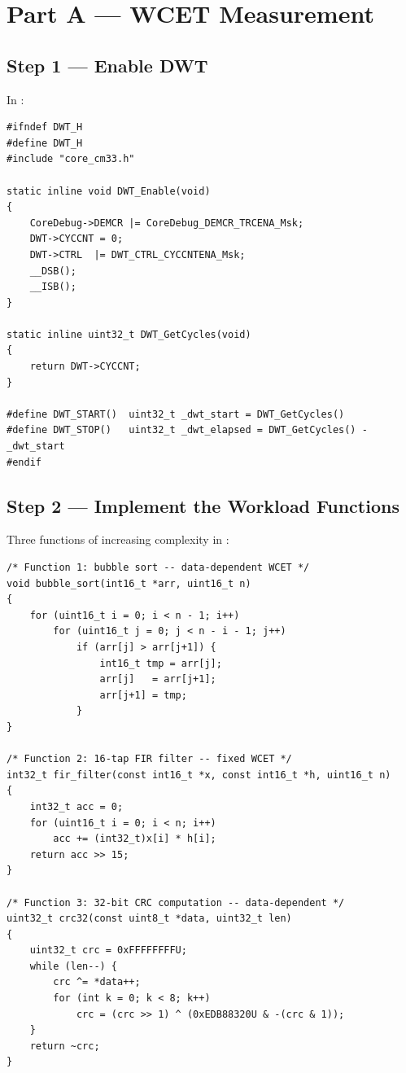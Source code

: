 \documentclass[11pt, a4paper]{article}
\begin{document}
\section{Part A --- WCET Measurement}

\subsection{Step 1 --- Enable DWT}

In :

\begin{lstlisting}[style=cstyle]
#ifndef DWT_H
#define DWT_H
#include "core_cm33.h"

static inline void DWT_Enable(void)
{
    CoreDebug->DEMCR |= CoreDebug_DEMCR_TRCENA_Msk;
    DWT->CYCCNT = 0;
    DWT->CTRL  |= DWT_CTRL_CYCCNTENA_Msk;
    __DSB();
    __ISB();
}

static inline uint32_t DWT_GetCycles(void)
{
    return DWT->CYCCNT;
}

#define DWT_START()  uint32_t _dwt_start = DWT_GetCycles()
#define DWT_STOP()   uint32_t _dwt_elapsed = DWT_GetCycles() - _dwt_start
#endif
\end{lstlisting}

\subsection{Step 2 --- Implement the Workload Functions}

Three functions of increasing complexity in :

\begin{lstlisting}[style=cstyle]
/* Function 1: bubble sort -- data-dependent WCET */
void bubble_sort(int16_t *arr, uint16_t n)
{
    for (uint16_t i = 0; i < n - 1; i++)
        for (uint16_t j = 0; j < n - i - 1; j++)
            if (arr[j] > arr[j+1]) {
                int16_t tmp = arr[j];
                arr[j]   = arr[j+1];
                arr[j+1] = tmp;
            }
}

/* Function 2: 16-tap FIR filter -- fixed WCET */
int32_t fir_filter(const int16_t *x, const int16_t *h, uint16_t n)
{
    int32_t acc = 0;
    for (uint16_t i = 0; i < n; i++)
        acc += (int32_t)x[i] * h[i];
    return acc >> 15;
}

/* Function 3: 32-bit CRC computation -- data-dependent */
uint32_t crc32(const uint8_t *data, uint32_t len)
{
    uint32_t crc = 0xFFFFFFFFU;
    while (len--) {
        crc ^= *data++;
        for (int k = 0; k < 8; k++)
            crc = (crc >> 1) ^ (0xEDB88320U & -(crc & 1));
    }
    return ~crc;
}
\end{lstlisting}
\end{document}
